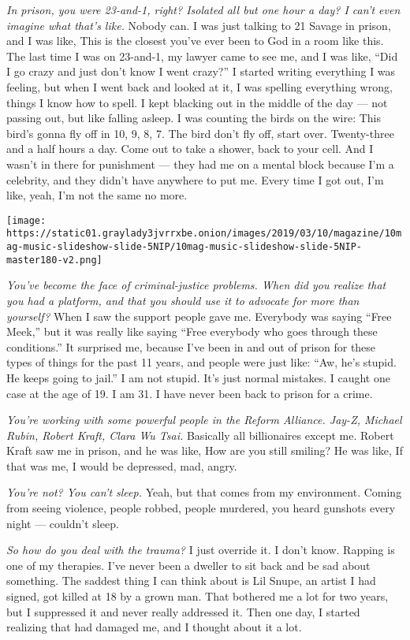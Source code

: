 \emph{In prison, you were 23-and-1, right? Isolated all but one hour a
day? I can't even imagine what that's like.} Nobody can. I was just
talking to 21 Savage in prison, and I was like, This is the closest
you've ever been to God in a room like this. The last time I was on
23-and-1, my lawyer came to see me, and I was like, ``Did I go crazy and
just don't know I went crazy?'' I started writing everything I was
feeling, but when I went back and looked at it, I was spelling
everything wrong, things I know how to spell. I kept blacking out in the
middle of the day --- not passing out, but like falling asleep. I was
counting the birds on the wire: This bird's gonna fly off in 10, 9, 8,
7. The bird don't fly off, start over. Twenty-three and a half hours a
day. Come out to take a shower, back to your cell. And I wasn't in there
for punishment --- they had me on a mental block because I'm a
celebrity, and they didn't have anywhere to put me. Every time I got
out, I'm like, yeah, I'm not the same no more.

\texttt{[image: https://static01.graylady3jvrrxbe.onion/images/2019/03/10/magazine/10mag-music-slideshow-slide-5NIP/10mag-music-slideshow-slide-5NIP-master180-v2.png]}

\emph{You've become the face of criminal-justice problems. When did you
realize that you had a platform, and that you should use it to advocate
for more than yourself?} When I saw the support people gave me.
Everybody was saying ``Free Meek,'' but it was really like saying ``Free
everybody who goes through these conditions.'' It surprised me, because
I've been in and out of prison for these types of things for the past 11
years, and people were just like: ``Aw, he's stupid. He keeps going to
jail.'' I am not stupid. It's just normal mistakes. I caught one case at
the age of 19. I am 31. I have never been back to prison for a crime.

\emph{You're working with some powerful people in the Reform Alliance.
Jay-Z, Michael Rubin, Robert Kraft, Clara Wu Tsai.} Basically all
billionaires except me. Robert Kraft saw me in prison, and he was like,
How are you still smiling? He was like, If that was me, I would be
depressed, mad, angry.

\emph{You're not? You can't sleep.} Yeah, but that comes from my
environment. Coming from seeing violence, people robbed, people
murdered, you heard gunshots every night --- couldn't sleep.

\emph{So how do you deal with the trauma?} I just override it. I don't
know. Rapping is one of my therapies. I've never been a dweller to sit
back and be sad about something. The saddest thing I can think about is
Lil Snupe, an artist I had signed, got killed at 18 by a grown man. That
bothered me a lot for two years, but I suppressed it and never really
addressed it. Then one day, I started realizing that had damaged me, and
I thought about it a lot.

